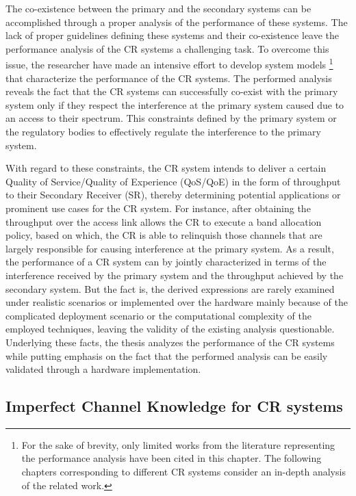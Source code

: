 The co-existence between the primary and the secondary systems can be accomplished through a proper analysis of the performance of these systems. The lack of proper guidelines defining these systems and their co-existence leave the performance analysis of the CR systems a challenging task. To overcome this issue, the researcher have made an intensive effort to develop system models \cite{Liang08, Kang209, Kang09}\footnote{For the sake of brevity, only limited works from the literature representing the performance analysis have been cited in this chapter. The following chapters corresponding to different CR systems consider an in-depth analysis of the related work.} that characterize the performance of the CR systems. The performed analysis reveals the fact that the CR systems can successfully co-exist with the primary system only if they respect the interference at the primary system caused due to an access to their spectrum. This constraints defined by the primary system or the regulatory bodies to effectively regulate the interference to the primary system. 

With regard to these constraints, the CR system intends to deliver a certain Quality of Service/Quality of Experience (QoS/QoE) in the form of throughput to their Secondary Receiver (SR), thereby determining potential applications or prominent use cases for the CR system. For instance, after obtaining the throughput over the access link allows the CR to execute a band allocation policy, based on which, the CR is able to relinquish those channels that are largely responsible for causing interference at the primary system. As a result, the performance of a CR system can by jointly characterized in terms of the interference received by the primary system and the throughput achieved by the secondary system. 
But the fact is, the derived expressions are rarely examined under realistic scenarios or implemented over the hardware mainly because of the complicated deployment scenario or the computational complexity of the employed techniques, leaving the validity of the existing analysis questionable. Underlying these facts, the thesis analyzes the performance of the CR systems while putting emphasis on the fact that the performed analysis can be easily validated through a hardware implementation. 

\subsection{Imperfect Channel Knowledge for CR systems}

